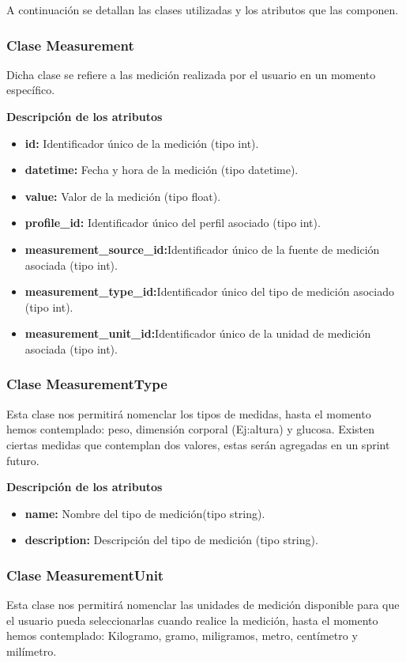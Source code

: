 A continuación se detallan las clases utilizadas y los atributos que las componen.

\subsubsection{Clase Measurement} 
Dicha clase se refiere a las medición realizada por el usuario en un momento específico. 

\textbf{Descripción de los atributos}
\begin{itemize}
	\item \textbf{id:} Identificador único de la medición (tipo int).
	\item \textbf{datetime:} Fecha y hora de la medición (tipo datetime).
	\item \textbf{value:} Valor de la medición (tipo float).
	\item \textbf{profile\_id:} Identificador único del perfil asociado (tipo int).
	\item \textbf{measurement\_source\_id:}Identificador único de la fuente de medición asociada (tipo int).
	\item \textbf{measurement\_type\_id:}Identificador único del tipo de medición asociado (tipo int).
	\item \textbf{measurement\_unit\_id:}Identificador único de la unidad de medición asociada (tipo int).
	
\end{itemize}

\subsubsection{Clase MeasurementType}
Esta clase nos permitirá  nomenclar  los tipos de medidas, hasta el momento hemos contemplado: peso, dimensión corporal (Ej:altura) y glucosa. Existen ciertas medidas que contemplan dos valores, estas serán agregadas en un sprint futuro.

\textbf{Descripción de los atributos}
\begin{itemize}
	\item \textbf{name: }	Nombre del tipo de medición(tipo string).
	\item \textbf{description:} Descripción del tipo de medición (tipo string).
\end{itemize}


\subsubsection{Clase MeasurementUnit}
Esta clase nos permitirá  nomenclar  las unidades de medición disponible para que el usuario pueda seleccionarlas cuando realice la medición, hasta el momento hemos contemplado: Kilogramo, gramo, miligramos, metro, centímetro y milímetro.

